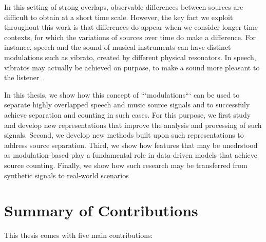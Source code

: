 In this setting of strong overlaps, observable differences between sources are difficult to obtain at a short time scale. However, the key fact we exploit throughout this work is that differences do appear when we consider longer time contexts, for which the variations of sources over time do make a difference.
For instance, speech and the sound of musical instruments can have distinct modulations such as vibrato, created by different physical resonators. In speech, vibratos may actually be achieved on purpose, to make a sound more pleasant to the listener~\cite{fletcher01}.
\par
In this thesis, we show how this concept of ```modulations``` can be used to separate highly overlapped speech and music source signals and
to successfuly achieve separation and counting in such cases.
For this purpose, we first study and develop new representations that improve the analysis and processing of such signals.
Second, we develop new methods built upon such representations to address source separation. Third, we show how features that may be unedrstood as modulation-based play a fundamental role in data-driven models that achieve source counting.
Finally, we show how such research may be transferred from synthetic signals to real-world scenarios 



\section{Summary of Contributions}

This thesis comes with five main contributions:

